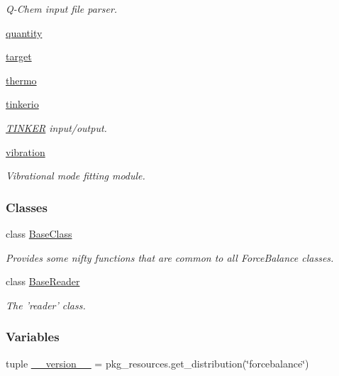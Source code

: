 \begin{DoxyCompactItemize}
\begin{DoxyCompactList}\small\item\em Q-\/\-Chem input file parser. \end{DoxyCompactList}\item 
\hyperlink{namespaceforcebalance_1_1quantity}{quantity}
\item 
\hyperlink{namespaceforcebalance_1_1target}{target}
\item 
\hyperlink{namespaceforcebalance_1_1thermo}{thermo}
\item 
\hyperlink{namespaceforcebalance_1_1tinkerio}{tinkerio}
\begin{DoxyCompactList}\small\item\em \hyperlink{classforcebalance_1_1tinkerio_1_1TINKER}{T\-I\-N\-K\-E\-R} input/output. \end{DoxyCompactList}\item 
\hyperlink{namespaceforcebalance_1_1vibration}{vibration}
\begin{DoxyCompactList}\small\item\em Vibrational mode fitting module. \end{DoxyCompactList}\end{DoxyCompactItemize}
\subsubsection*{Classes}
\begin{DoxyCompactItemize}
\item 
class \hyperlink{classforcebalance_1_1BaseClass}{Base\-Class}
\begin{DoxyCompactList}\small\item\em Provides some nifty functions that are common to all Force\-Balance classes. \end{DoxyCompactList}\item 
class \hyperlink{classforcebalance_1_1BaseReader}{Base\-Reader}
\begin{DoxyCompactList}\small\item\em The 'reader' class. \end{DoxyCompactList}\end{DoxyCompactItemize}
\subsubsection*{Variables}
\begin{DoxyCompactItemize}
\item 
tuple \hyperlink{namespaceforcebalance_a6c10581ea309550b5703fbe56f62e8a2}{\-\_\-\-\_\-version\-\_\-\-\_\-} = pkg\-\_\-resources.\-get\-\_\-distribution(\char`\"{}forcebalance\char`\"{})
\end{DoxyCompactItemize}


